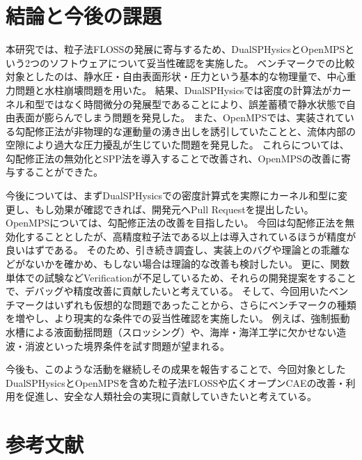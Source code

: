 \section{結論と今後の課題}
	本研究では、粒子法FLOSSの発展に寄与するため、DualSPHysicsとOpenMPSという2つのソフトウェアについて妥当性確認を実施した。
	ベンチマークでの比較対象としたのは、静水圧・自由表面形状・圧力という基本的な物理量で、中心重力問題と水柱崩壊問題を用いた。
	結果、DualSPHysicsでは密度の計算法がカーネル和型ではなく時間微分の発展型であることにより、誤差蓄積で静水状態で自由表面が膨らんでしまう問題を発見した。
	また、OpenMPSでは、実装されている勾配修正法が非物理的な運動量の湧き出しを誘引していたことと、流体内部の空隙により過大な圧力擾乱が生じていた問題を発見した。
	これらについては、勾配修正法の無効化とSPP法を導入することで改善され、OpenMPSの改善に寄与することができた。

	今後については、まずDualSPHysicsでの密度計算式を実際にカーネル和型に変更し、もし効果が確認できれば、開発元へPull Requestを提出したい。
	OpenMPSについては、勾配修正法の改善を目指したい。
	今回は勾配修正法を無効化することとしたが、高精度粒子法である以上は導入されているほうが精度が良いはずである。
	そのため、引き続き調査し、実装上のバグや理論との乖離などがないかを確かめ、もしない場合は理論的な改善も検討したい。
	更に、関数単体での試験などVerificationが不足しているため、それらの開発提案をすることで、デバッグや精度改善に貢献したいと考えている。
	そして、今回用いたベンチマークはいずれも仮想的な問題であったことから、さらにベンチマークの種類を増やし、より現実的な条件での妥当性確認を実施したい。
	例えば、強制振動水槽による液面動揺問題（スロッシング）や、海岸・海洋工学に欠かせない造波・消波といった境界条件を試す問題が望まれる。

	今後も、このような活動を継続しその成果を報告することで、今回対象としたDualSPHysicsとOpenMPSを含めた粒子法FLOSSや広くオープンCAEの改善・利用を促進し、安全な人類社会の実現に貢献していきたいと考えている。

\section*{参考文献}

